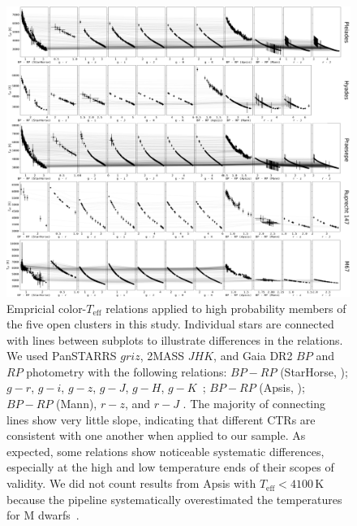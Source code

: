 \documentclass{aa}
\begin{document}
   \begin{figure}
		\centering
           \includegraphics[angle=90, width=\hsize]{pics/clusters/Teff_spread_all.png}

      \caption{Empricial color-$T_\mathrm{eff}$ relations applied to high probability members of the five open clusters in this study. Individual stars are connected with lines between subplots to illustrate differences in the relations. We used PanSTARRS $griz$, 2MASS $JHK$, and Gaia DR2 $BP$ and $RP$ photometry with the following relations: $BP-RP$ (StarHorse, \citealt{anders_starhorse_2019}); $g-r$, $g-i$, $g-z$, $g-J$, $g-H$, $g-K$~\citep{boyajian_stellar_2013}; $BP-RP$ (Apsis, \citealt{andrae_gaiaapsis_2018}); $BP-RP$ (Mann), $r-z$, and $r-J$ \citep{mann_erratum_2016}. The majority of connecting lines show very little slope, indicating that different CTRs are consistent with one another when applied to our sample. As expected, some relations show noticeable systematic differences, especially at the high and low temperature ends of their scopes of validity. We did not count results from Apsis with $T_\mathrm{eff}<4100\,$K because the pipeline systematically overestimated the temperatures for M dwarfs~\citep{andrae_gaiaapsis_2018,kesseli2019}.}
         \label{fig:teff_spread}
   \end{figure}
\end{document}
